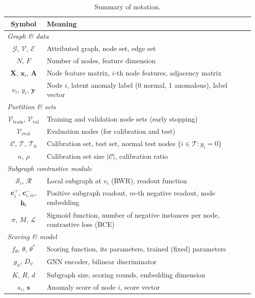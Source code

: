 \documentclass[a4paper]{cas-dc}
\theoremstyle{definition}
\begin{document}
\begin{table}[pos=t]
\centering
\caption{Summary of notation.}
\label{tab:notation}
\renewcommand{\arraystretch}{1.2}
\footnotesize
\begin{tabular}{@{}cl@{}}
\toprule
\textbf{Symbol} & \textbf{Meaning} \\
\midrule
\multicolumn{2}{l}{\textit{Graph \& data}} \\
$\mathcal{G}$, $\mathcal{V}$, $\mathcal{E}$ & Attributed graph, node set, edge set \\
$N$, $F$ & Number of nodes, feature dimension \\
$\mathbf{X}$, $\mathbf{x}_i$, $\mathbf{A}$ & Node feature matrix, $i$-th node features, adjacency matrix \\
$v_i$, $y_i$, $\mathbf{y}$ & Node $i$, latent anomaly label (0 normal, 1 anomalous), label vector \\
\midrule
\multicolumn{2}{l}{\textit{Partition \& sets}} \\
$\mathcal{V}_{\text{train}}$, $\mathcal{V}_{\text{val}}$ & Training and validation node sets (early stopping) \\
$\mathcal{V}_{\text{eval}}$ & Evaluation nodes (for calibration and test) \\
$\mathcal{C}$, $\mathcal{T}$, $\mathcal{T}_0$ & Calibration set, test set, normal test nodes $\{i \in \mathcal{T} : y_i = 0\}$ \\
$n$, $\rho$ & Calibration set size $|\mathcal{C}|$, calibration ratio \\
\midrule
\multicolumn{2}{l}{\textit{Subgraph contrastive module}} \\
$\mathcal{S}_i$, $\mathcal{R}$ & Local subgraph at $v_i$ (RWR), readout function \\
$\mathbf{c}_i^+$, $\mathbf{c}_{i,m}^-$, $\mathbf{h}_i$ & Positive subgraph readout, $m$-th negative readout, node embedding \\
$\sigma$, $M$, $\mathcal{L}$ & Sigmoid function, number of negative instances per node, contrastive loss (BCE) \\
\midrule
\multicolumn{2}{l}{\textit{Scoring \& model}} \\
$f_\theta$, $\theta$, $\theta^*$ & Scoring function, its parameters, trained (fixed) parameters \\
$g_\phi$, $D_\psi$ & GNN encoder, bilinear discriminator \\
$K$, $R$, $d$ & Subgraph size, scoring rounds, embedding dimension \\
$s_i$, $\mathbf{s}$ & Anomaly score of node $i$, score vector \\

\end{tabular}
\end{table}
\end{document}
